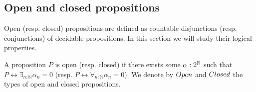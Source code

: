 %
\subsection{Open and closed propositions}
Open (resp. closed) propositions are defined as countable disjunctions (resp. conjunctions) of decidable propositions.
In this section we will study their logical properties.

\begin{definition}
A proposition $P$ is open (resp. closed) if there exists some $\alpha:2^{\mathbb{N}}$ such that $P \leftrightarrow \exists_{n:\mathbb N} \alpha_n = 0$ (resp. $P \leftrightarrow \forall_{n:\mathbb N} \alpha_n = 0$). We denote by $\Open$ and $\Closed$ the types of open and closed propositions.
\end{definition}

